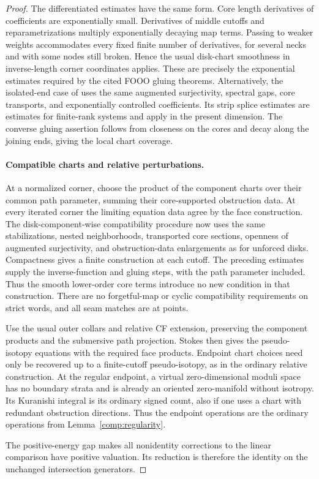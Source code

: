 \documentclass[11pt]{article}
\numberwithin{equation}{section}
\theoremstyle{definition}
\theoremstyle{remark}
\begin{document}
\begin{proof}
The differentiated estimates have the same form.  Core length
derivatives of coefficients are exponentially small.  Derivatives
of middle cutoffs and reparametrizations multiply exponentially
decaying map terms.  Passing to weaker weights accommodates every
fixed finite number of derivatives, for several necks and with
some nodes still broken.  Hence the usual disk-chart smoothness in
inverse-length corner coordinates applies.  These are precisely
the exponential estimates required by the cited FOOO gluing
theorems.  Alternatively, the isolated-end case of
\cite[Lemma~4.11 and Proposition~4.12]{A8} uses the same augmented
surjectivity, spectral gaps, core transports, and exponentially
controlled coefficients.  Its strip splice estimates are estimates
for finite-rank systems and apply in the present dimension.  The
converse gluing assertion follows from closeness on the cores and
decay along the joining ends, giving the local chart coverage.

\paragraph{Compatible charts and relative perturbations.}
At a normalized corner, choose the product of the component
charts over their common path parameter, summing their
core-supported obstruction data.  At every iterated corner the
limiting equation data agree by the face construction.  The
disk-component-wise compatibility procedure now uses the same
stabilizations, nested neighborhoods, transported core sections,
openness of augmented surjectivity, and obstruction-data
enlargements as for unforced disks.  Compactness gives a finite
construction at each cutoff.  The preceding estimates supply the
inverse-function and gluing steps, with the path parameter included.
Thus the smooth lower-order core terms introduce no new condition
in that construction.  There are no forgetful-map or cyclic
compatibility requirements on strict words, and all seam matches
are at points.

Use the usual outer collars and relative CF extension, preserving
the component products and the submersive path projection.  Stokes
then gives the pseudo-isotopy equations with the required face
products.  Endpoint chart choices need only be recovered up to a
finite-cutoff pseudo-isotopy, as in the ordinary relative
construction.  At the regular endpoint, a virtual zero-dimensional
moduli space has no boundary strata and is already an oriented
zero-manifold without isotropy.  Its Kuranishi integral is its
ordinary signed count, also if one uses a chart with redundant
obstruction directions.  Thus the endpoint operations are the
ordinary operations from Lemma~\ref{comp:regularity}.

The positive-energy gap makes all nonidentity corrections to the
linear comparison have positive valuation.  Its reduction is
therefore the identity on the unchanged intersection generators.
\end{proof}
\end{document}
